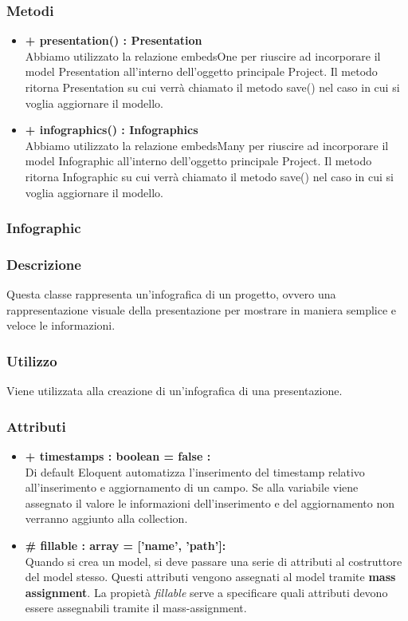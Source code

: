 	\subsubsection*{Metodi}
	\begin{itemize}
		\item \textbf{+ presentation() : Presentation}\\
		Abbiamo utilizzato la relazione embedsOne per riuscire ad incorporare il model Presentation all’interno dell’oggetto principale Project. Il metodo ritorna Presentation su cui verrà chiamato il metodo save() nel caso in cui si voglia aggiornare il modello.
		\item \textbf{+ infographics() : Infographics}\\
		Abbiamo utilizzato la relazione embedsMany per riuscire ad incorporare il model Infographic all’interno dell’oggetto principale Project. Il metodo ritorna Infographic su cui verrà chiamato il metodo save() nel caso in cui si voglia aggiornare il modello.
	\end{itemize}

\newpage
\subsubsection{Infographic}


	\subsubsection*{Descrizione}
	Questa classe rappresenta un’infografica di un progetto, ovvero una rappresentazione visuale della presentazione per mostrare in maniera semplice e veloce le informazioni.
	
	\subsubsection*{Utilizzo}
Viene utilizzata alla creazione di un’infografica di una presentazione.

\subsubsection*{Attributi}
	\begin{itemize}
		\item \textbf{+ timestamps : boolean = false :}\\
		Di default Eloquent automatizza l'inserimento del timestamp relativo all'inserimento e aggiornamento di un campo. Se alla variabile viene assegnato il valore le informazioni dell'inserimento e del aggiornamento non verranno aggiunto alla collection.
		\item \textbf{\# fillable : array = [’name’, ’path’]:}\\
		Quando si crea un model, si deve passare una serie di attributi al costruttore del model stesso. Questi attributi vengono assegnati al model tramite \textbf{mass assignment}. La propietà \textit{fillable} serve a specificare quali attributi devono essere assegnabili tramite il mass-assignment.
	\end{itemize}


